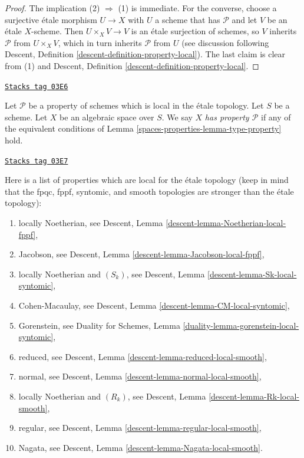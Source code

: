 \begin{proof}
The implication (2) $\Rightarrow$ (1) is immediate.
For the converse, choose a surjective \'etale morphism $U \to X$
with $U$ a scheme that has $\mathcal{P}$ and let $V$ be an \'etale
$X$-scheme. Then $U \times_X V \rightarrow V$ is an \'etale surjection
of schemes, so $V$ inherits $\mathcal{P}$ from $U \times_X V$, which in
turn inherits $\mathcal{P}$ from $U$ (see discussion following
Descent, Definition \ref{descent-definition-property-local}).
The last claim is clear from (1) and
Descent, Definition \ref{descent-definition-property-local}.
\end{proof}

\begin{definition}
\label{spaces-properties-definition-type-property}
\href{https://stacks.math.columbia.edu/tag/03E6}{\texttt{Stacks tag 03E6}}

Let $\mathcal{P}$ be a property of schemes which is
local in the \'etale topology.
Let $S$ be a scheme.
Let $X$ be an algebraic space over $S$.
We say $X$ {\it has property $\mathcal{P}$}
if any of the equivalent conditions of
Lemma \ref{spaces-properties-lemma-type-property}
hold.
\end{definition}

\begin{remark}
\label{spaces-properties-remark-list-properties-local-etale-topology}
\href{https://stacks.math.columbia.edu/tag/03E7}{\texttt{Stacks tag 03E7}}

Here is a list of properties which are local for the \'etale topology
(keep in mind that the fpqc, fppf, syntomic, and smooth topologies are
stronger than the \'etale topology):
\begin{enumerate}
\item locally Noetherian, see
Descent, Lemma \ref{descent-lemma-Noetherian-local-fppf},
\item Jacobson, see
Descent, Lemma \ref{descent-lemma-Jacobson-local-fppf},
\item locally Noetherian and $(S_k)$, see
Descent, Lemma \ref{descent-lemma-Sk-local-syntomic},
\item Cohen-Macaulay, see
Descent, Lemma \ref{descent-lemma-CM-local-syntomic},
\item Gorenstein, see
Duality for Schemes, Lemma \ref{duality-lemma-gorenstein-local-syntomic},
\item reduced, see
Descent, Lemma \ref{descent-lemma-reduced-local-smooth},
\item normal, see
Descent, Lemma \ref{descent-lemma-normal-local-smooth},
\item locally Noetherian and $(R_k)$, see
Descent, Lemma \ref{descent-lemma-Rk-local-smooth},
\item regular, see
Descent, Lemma \ref{descent-lemma-regular-local-smooth},
\item Nagata, see
Descent, Lemma \ref{descent-lemma-Nagata-local-smooth}.
\end{enumerate}
\end{remark}


